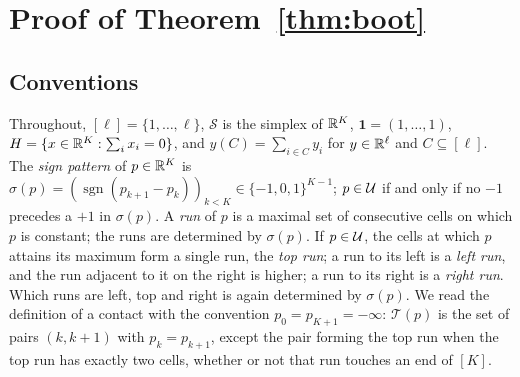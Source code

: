 

\providecommand{\Ex}{\mathrm{E}}
\providecommand{\cC}{\mathcal{C}}
\providecommand{\cL}{\mathcal{L}}
\providecommand{\one}{\mathbf{1}}
\providecommand{\dBL}{d_{\mathrm{BL}}}
\providecommand{\simplex}{\mathcal{S}}
\providecommand{\sgn}{\operatorname{sgn}}

\section{Proof of Theorem~\ref{thm:boot}}\label{sec:supp-boot}

\subsection{Conventions}\label{sec:supp-conv}

Throughout, $[\ell]=\{1,\dots,\ell\}$, $\simplex$ is the simplex of $\mathbb{R}^K$, $\one=(1,\dots,1)$, $H=\{x\in\mathbb{R}^K:\sum_ix_i=0\}$, and $y(C)=\sum_{i\in C}y_i$ for $y\in\mathbb{R}^\ell$ and $C\subseteq[\ell]$. The \emph{sign pattern} of $p\in\mathbb{R}^K$ is $\sigma(p)=(\sgn(p_{k+1}-p_k))_{k<K}\in\{-1,0,1\}^{K-1}$; $p\in\mathcal{U}$ if and only if no $-1$ precedes a $+1$ in $\sigma(p)$. A \emph{run} of $p$ is a maximal set of consecutive cells on which $p$ is constant; the runs are determined by $\sigma(p)$. If $p\in\mathcal{U}$, the cells at which $p$ attains its maximum form a single run, the \emph{top run}; a run to its left is a \emph{left run}, and the run adjacent to it on the right is higher; a run to its right is a \emph{right run}. Which runs are left, top and right is again determined by $\sigma(p)$. We read the definition of a contact with the convention $p_0=p_{K+1}=-\infty$: $\mathcal T(p)$ is the set of pairs $(k,k+1)$ with $p_k=p_{k+1}$, except the pair forming the top run when the top run has exactly two cells, whether or not that run touches an end of $[K]$.

